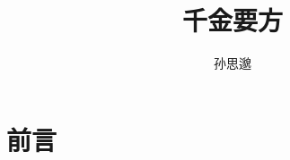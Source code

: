 \documentclass{ctexbook}
\title{千金要方}
\author{孙思邈}
\date{}
\begin{document}
	
	\maketitle
	\tableofcontents
	
	\chapter{前言}
	
\end{document}
